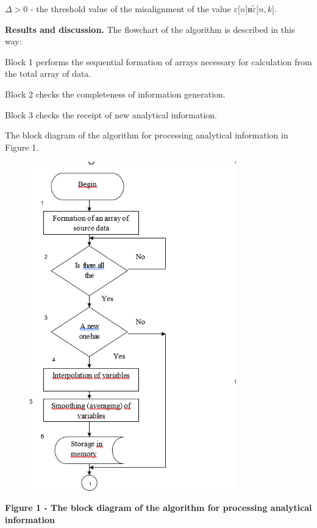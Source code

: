 \(\Delta > 0\) - the threshold value of the misalignment of the value
\(\varepsilon\lbrack n\rbrack и\widetilde{\varepsilon}\lbrack n,k\rbrack\).

\textbf{Results and discussion.} The flowchart of the algorithm is
described in this way:

Block 1 performs the sequential formation of arrays necessary for
calculation from the total array of data.

Block 2 checks the completeness of information generation.

Block 3 checks the receipt of new analytical information.

The block diagram of the algorithm for processing analytical information
in Figure 1.

\begin{figure}[H]
	\centering
	\includegraphics[width=0.8\textwidth]{assets/7}
	\caption*{}
\end{figure}

\textbf{Figure 1 - The block diagram of the algorithm for processing
analytical information}

